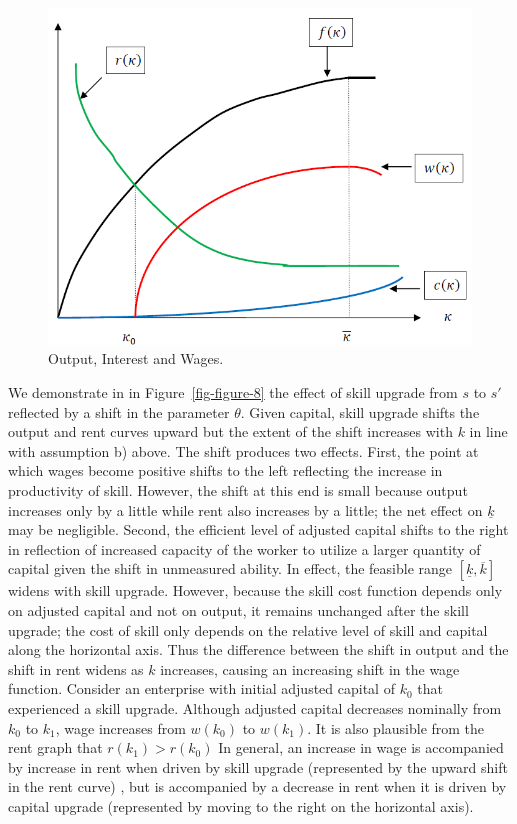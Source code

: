 \documentclass[
  a4paper,
  DIV=11,
  numbers=noendperiod]{scrartcl}
\begin{document}
\begin{figure}

{\centering \includegraphics{figures/figure-7.png}

}

\caption{\label{fig-figure-7}Output, Interest and Wages.}

\end{figure}

We demonstrate in in Figure~\ref{fig-figure-8} the effect of skill
upgrade from \(s\) to \(s'\) reflected by a shift in the parameter
\(\theta.\) Given capital, skill upgrade shifts the output and rent
curves upward but the extent of the shift increases with \(k\) in line
with assumption b) above. The shift produces two effects. First, the
point at which wages become positive shifts to the left reflecting the
increase in productivity of skill. However, the shift at this end is
small because output increases only by a little while rent also
increases by a little; the net effect on \(\underline{k}\) may be
negligible. Second, the efficient level of adjusted capital shifts to
the right in reflection of increased capacity of the worker to utilize a
larger quantity of capital given the shift in unmeasured ability. In
effect, the feasible range \([\underline{k},\overline{k}]\) widens with
skill upgrade. However, because the skill cost function depends only on
adjusted capital and not on output, it remains unchanged after the skill
upgrade; the cost of skill only depends on the relative level of skill
and capital along the horizontal axis. Thus the difference between the
shift in output and the shift in rent widens as \(k\) increases, causing
an increasing shift in the wage function. Consider an enterprise with
initial adjusted capital of \(k_0\) that experienced a skill upgrade.
Although adjusted capital decreases nominally from \(k_0\) to \(k_1\),
wage increases from \(w(k_0)\) to \(w(k_1)\). It is also plausible from
the rent graph that \(r(k_1)>r(k_0)\) In general, an increase in wage is
accompanied by increase in rent when driven by skill upgrade
(represented by the upward shift in the rent curve) , but is accompanied
by a decrease in rent when it is driven by capital upgrade (represented
by moving to the right on the horizontal axis).
\end{document}
